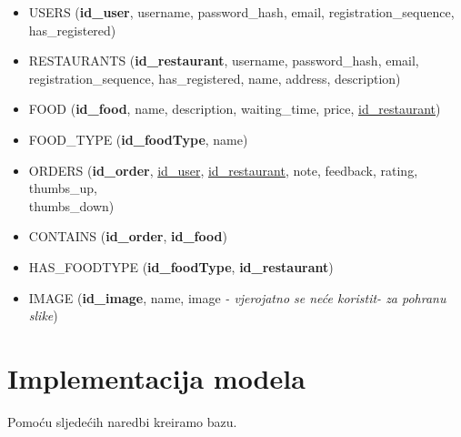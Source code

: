 \documentclass[12pt]{scrartcl}
\begin{document}
\begin{itemize}
    \item[] \textsf{USERS (\textbf{id\_user}, username, password\_hash, email, registration\_sequence, \\has\_registered)}
    \item[] \textsf{RESTAURANTS (\textbf{id\_restaurant}, username, password\_hash, email, \\registration\_sequence, has\_registered, name, address, description)}
    \item[] \textsf{FOOD (\textbf{id\_food}, name, description, waiting\_time, price, \underline{id\_restaurant})}
    \item[] \textsf{FOOD\_TYPE (\textbf{id\_foodType}, name)}
    \item[] \textsf{ORDERS (\textbf{id\_order}, \underline{id\_user}, \underline{id\_restaurant}, note, feedback, rating, thumbs\_up,\\ thumbs\_down)}
    \item[] \textsf{CONTAINS (\textbf{id\_order}, \textbf{id\_food})}
    \item[] \textsf{HAS\_FOODTYPE (\textbf{id\_foodType}, \textbf{id\_restaurant})}
    \item[] \textsf{IMAGE (\textbf{id\_image}, name, image \emph{- vjerojatno se neće koristit- za pohranu slike})}

\end{itemize}

\pagebreak[3]

\section{Implementacija modela}

Pomoću sljedećih naredbi kreiramo bazu.
\end{document}
